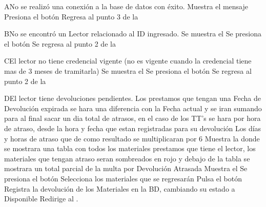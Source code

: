		\begin{UCtrayectoriaA}{A}{No se realizó una conexión a la base de datos con éxito.}
			\UCpaso[\UCsist] Muestra el mensaje 
			\UCpaso[\UCactor] Presiona el botón 
			\UCpaso[\UCsist] Regresa al punto 3 de la 
		\end{UCtrayectoriaA}
		\begin{UCtrayectoriaA}{B}{No se encontró un Lector relacionado al ID ingresado.}
			\UCpaso[\UCsist] Se muestra el 
			\UCpaso[\UCactor] Se presiona el botón 			
			\UCpaso[\UCsist]	Se regresa al punto 2 de la 
		\end{UCtrayectoriaA}
		\begin{UCtrayectoriaA}{C}{El lector no tiene credencial vigente (no es vigente cuando la credencial tiene mas de 3 meses de tramitarla)}
			\UCpaso[\UCsist] Se muestra el 
			\UCpaso[\UCactor] Se presiona el botón 			
			\UCpaso[\UCsist]	Se regresa al punto 2 de la 
		\end{UCtrayectoriaA}	
		\begin{UCtrayectoriaA}{D}{El lector tiene devoluciones pendientes.}
			\UCpaso[\UCsist] Los prestamos que tengan una Fecha de Devolución expirada se hara una diferencia con la Fecha actual y se iran sumando para al final sacar un dia total de atrasos, en el caso de los TT's se hara por hora de atraso, desde la hora y fecha que estan registradas para su devolución
			\UCpaso[\UCsist] Los días y horas de atraso que de como resultado se multiplicaran por 6
			\UCpaso[\UCsist] Muestra la  donde se mostrara una tabla con todos los materiales prestamos que tiene el lector, los materiales que tengan atraso seran sombreados en rojo y debajo de la tabla se mostrara un total parcial de la multa por Devolución Atrasada
			\UCpaso[\UCsist] Muestra el 
			\UCpaso[\UCactor] Se presiona el botón 
			\UCpaso[\UCactor]	Selecciona los materiales que se regresarán
			\UCpaso[\UCactor]	Pulsa el botón 
			\UCpaso[\UCsist]	Registra la devolución de los Materiales en la BD, cambiando su estado a Disponible
			\UCpaso[\UCsist]	Redirige al .
		\end{UCtrayectoriaA}
